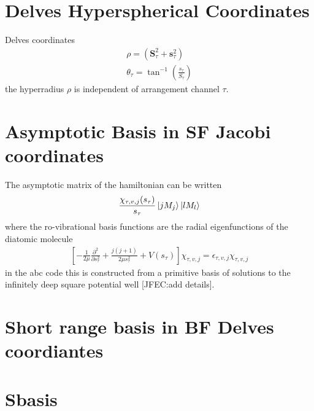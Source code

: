 \documentclass[aps,pra,onecolumn,showpacs,floatfix]{revtex4}
\begin{document}
\section{Delves Hyperspherical Coordinates}
Delves coordinates\cite{Delves:1958,Delves:1960}
\begin{align}\label{eqn:delves}
	\rho = (\mathbf{S}^2_\tau + \mathbf{s}^2_\tau ) \\
	\theta_\tau = \tan^{-1}({\frac{s_\tau}{S_\tau}})
\end{align}
the hyperradius $\rho$ is independent of arrangement channel $\tau$.

\section{Asymptotic Basis in SF Jacobi coordinates}
The asymptotic matrix of the hamiltonian can be written
\begin{align}\label{eqn:delves}
	\frac{\chi_{\tau,v,j}(s_\tau)}{s_\tau}\ket{jM_j}\ket{lM_l}
\end{align}
where the ro-vibrational basis functions are the radial eigenfunctions of the
diatomic molecule
\begin{align}\label{eqn:delves}
\left[-\frac{1}{2\mu}\frac{\partial^2}{\partial s_\tau^2} + \frac{j(j+1)}{2\mu s_\tau^2} + V(s_\tau)\right]\chi_{\tau,v,j}= \epsilon_{\tau,v,j}\chi_{\tau,v,j}
\end{align}
in the abc code this is constructed from a primitive basis of solutions to the
infinitely deep square potential well [JFEC:\@ add details].

\section{Short range basis in BF Delves coordiantes}

\section{Sbasis}
\begin{acknowledgments}
\end{acknowledgments}


\end{document}
